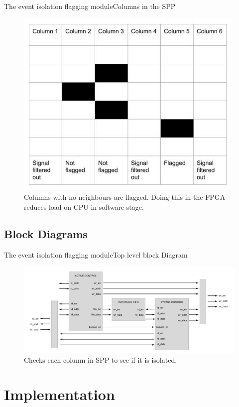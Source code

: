 \documentclass{beamer}
\begin{document}
\begin{frame}{The event isolation flagging module}{Columns in the SPP}
  \begin{figure}
    \includegraphics[scale=0.3]{Columns}
    \caption{\centering Columns with no neighbours are flagged. Doing this in
    the FPGA reduces load on CPU in software stage.}
  \end{figure}
\end{frame}

\subsection{Block Diagrams}

\begin{frame}{The event isolation flagging module}{Top level block Diagram}
  \begin{figure}
    \includegraphics[scale=0.4]{TopLevelBlock}
    \caption{Checks each column in SPP to see if it is isolated.}
  \end{figure}
\end{frame}

\section{Implementation}
\end{document}
